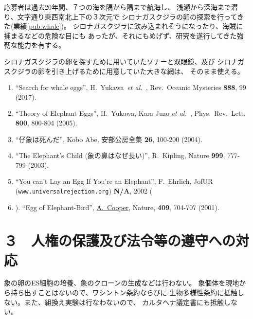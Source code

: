 \documentclass[11pt,a4j,dvipdfmx]{jarticle} 					%
\newcommand{\研究課題名}{象の卵}
\newcommand{\研究機関名}{逢坂大学}
\newcommand{\研究代表者氏名}{湯川秀樹}
\newcommand{\研究期間の最終元号年度}{8}  %
\newcommand{\paper}[6]{%
	\item ``#1'', #2, #3 {\bf #4}, #5 (#6).			%
}
\newcommand{\etal}{\textit{et al.\ }}
\newcommand{\yukawa}{H.~Yukawa}					%
\newcommand{\prl}{Phys.\ Rev.\ Lett.\ }		%
\begin{document}
	応募者は過去20年間、７つの海を隅から隅まで航海し、
	浅瀬から深海まで潜り、文字通り東西南北上下の３次元で
	シロナガスクジラの卵の探索を行ってきた(業績\ref{pub:whale})。		%
	シロナガスクジラに飲み込まれそうになったり、海賊に捕まるなどの危険な目にも
	あったが、それにもめげず、研究を遂行してきた強靭な能力を有する。

	シロナガスクジラの卵を探すために用いていたソナーと双眼鏡、及び
	シロナガスクジラの卵を引き上げるために用意していた大きな網は、
	そのまま使える。
	\begin{enumerate}
		\paper{Search for whale eggs}{\yukawa\ \etal}{Rev.\ Oceanic Mysteries}{888}{99}{2017}
			\label{pub:whale}
				
		\paper{Theory of Elephant Eggs}{\yukawa, Kara Juzo \etal}{\prl}{800}{800-804}{2005}
			\label{pub:theoegg}
				
		\paper{仔象は死んだ}{Kobo Abe}{安部公房全集}{26}{100-200}{2004}
		
		\paper{The Elephant's Child (象の鼻はなぜ長い)}{R.~Kipling}{Nature}{999}{777-799}{2003}

		\paper{You can't Lay an Egg If You're an Elephant}{F.~Ehrlich}
			{JofUR\\({\tt www.universalrejection.org})}{{\bf N/A}}{2002}
		
		\item ``Egg of Elephant-Bird'', 
				\underline{A.~Cooper},
				Nature, {\bf 409}, 704-707 (2001).	%
	\end{enumerate}




\section{３　人権の保護及び法令等の遵守への対応}

	象の卵のES細胞の培養、象のクローンの生成などは行わない。
	象個体を現地から持ち出すことはないので、ワシントン条約ならびに
        生物多様性条約に抵触しない。また、組換え実験は行なわないので、
        カルタヘナ議定書にも抵触しない。
\end{document}
